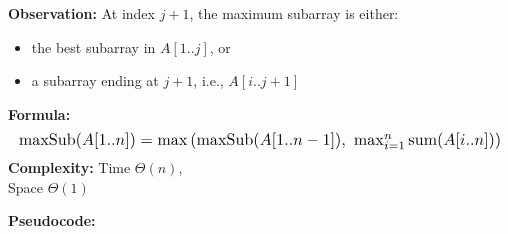 \documentclass[a4paper,landscape]{article}
\begin{document}
\begin{multicols}{7}
\textbf{Observation:}
At index \( j+1 \), the maximum subarray is either:
\begin{itemize}[noitemsep,itemsep=0pt]
    \item the best subarray in \( A[1..j] \), or
    \item a subarray ending at \( j+1 \), i.e., \( A[i..j+1] \)
\end{itemize}
\textbf{Formula:}
\[
\resizebox{1\textwidth}{!}{$
    \text{maxSub}(A[1..n]) = \max\left(
    \text{maxSub}(A[1..n-1]),\ 
    \max_{i=1}^{n} \text{sum}(A[i..n])
    \right)
$}
\]
\textbf{Complexity:} Time \( \Theta(n) \), \\Space \( \Theta(1) \)

\textbf{Pseudocode:}


\end{multicols}
\end{document}

